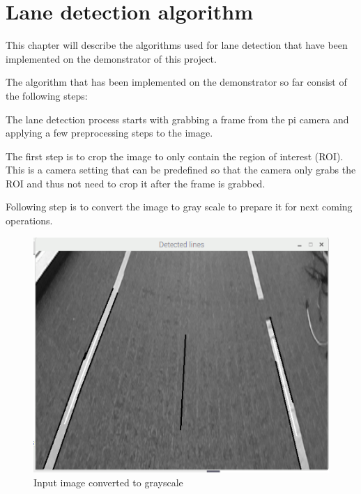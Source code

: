 

\section{Lane detection algorithm}


This chapter will describe the algorithms used for lane detection that have been implemented on the demonstrator of this project. 

The algorithm that has been implemented on the demonstrator so far consist of the following steps:

The lane detection process starts with grabbing a frame from the pi camera and applying a few preprocessing steps to the image. 

The first step is to crop the image to only contain the region of interest (ROI). This is a camera setting that can be predefined so that the camera only grabs the ROI and thus not need to crop it after the frame is grabbed.


Following step is to convert the image to gray scale to prepare it for next coming operations. 



\begin{figure}[H]
  \includegraphics[scale=0.7]{./img/gray.png}
  \centering
  \caption{Input image converted to grayscale}
  \label{fig:Input image converted to grayscale}
\end{figure}


